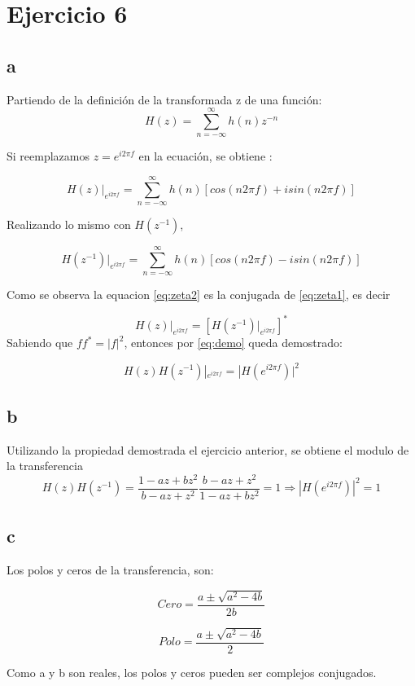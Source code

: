 \documentclass[../../guia1.tex]{subfiles}
\begin{document}
\section*{Ejercicio 6}
\subsection*{a}
Partiendo de la definición de la transformada z de una función:
\begin{equation}
H(z)=\sum_{n=-\infty}^{\infty} h(n) z^{-n}
\end{equation}

Si reemplazamos $z=e^{i2\pi f}$ en la ecuación, se obtiene :

\begin{equation}
H(z)|_{e^{i2\pi f}} = \sum_{n=-\infty}^{\infty} h(n)\left[ cos(n2\pi f) + i sin(n2\pi f) \right] \label{eq:zeta1}
\end{equation}

Realizando lo mismo con $H(z^{-1})$,

\begin{equation}
H(z^{-1})|_{e^{i2\pi f}} = \sum_{n=-\infty}^{\infty}h(n) \left[ cos(n2\pi f) - i sin(n2\pi f) \right] \label{eq:zeta2}
\end{equation}

Como se observa la equacion \ref{eq:zeta2} es la conjugada de \ref{eq:zeta1}, es decir

\begin{equation}
H(z)|_{e^{i2\pi f}} = \left[ H(z^{-1})|_{e^{i2\pi f}} \right]^* \label{eq:demo}
\end{equation}
Sabiendo que $f f^* =|f|^2 $, entonces por \ref{eq:demo} queda demostrado:

\begin{equation}
H(z)H(z^{-1})|_{e^{i2\pi f}}=|H(e^{i2\pi f})|^2
\end{equation}

\subsection*{b}
Utilizando la propiedad demostrada el ejercicio anterior, se obtiene el modulo de la transferencia
\begin{equation}
H(z)H(z^{-1})=\frac{1 - a z + b z^2}{b - az + z^2} \frac{b - az + z^2}{1 - a z + b z^2} = 1 \Rightarrow |H(e^{i2\pi f})|^2 =1
\end{equation}


\subsection*{c}
Los polos y ceros de la transferencia, son:

\begin{equation}
Cero=\frac{a \pm \sqrt{a^2-4b}}{2b}
\end{equation}

\begin{equation}
Polo=\frac{a \pm \sqrt{a^2-4b}}{2}
\end{equation}

Como a y b son reales, los polos y ceros pueden ser complejos conjugados.
\end{document}
